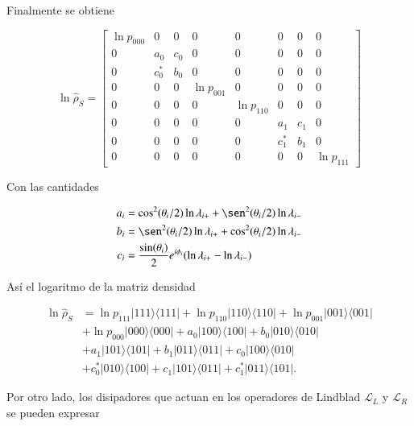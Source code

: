 \begin{appendixs}
Finalmente se obtiene

\begin{equation*}
    \ln \hat{\rho}_{S} = 
    \begin{bmatrix}
        \ln p_{000} & 0 & 0 & 0 & 0 & 0 & 0 & 0 \\
        0 & a_{0} & c_{0} & 0 & 0 & 0 & 0 & 0 \\
        0 & c^{*}_{0} & b_{0} & 0 & 0 & 0 & 0 & 0 \\
        0 & 0 & 0 & \ln p_{001} & 0 & 0 & 0 & 0 \\
        0 & 0 & 0 & 0 & \ln p_{110} & 0 & 0 & 0 \\
        0 & 0 & 0 & 0 & 0 & a_{1} & c_{1} & 0 \\
        0 & 0 & 0 & 0 & 0 & c^{*}_{1} & b_{1} & 0 \\
        0 & 0 & 0 & 0 & 0 & 0 & 0 & \ln p_{111} 
        \end{bmatrix}
\end{equation*}

Con las cantidades 

\begin{align*}
    a_{i} & = \cos^{2}(\theta_{i}/2) \ln \lambda_{i+} + \sen^{2}(\theta_{i}/2) \ln \lambda_{i-} \\
    b_{i} & = \sen^{2}(\theta_{i}/2) \ln \lambda_{i+} + \cos^{2}(\theta_{i}/2) \ln \lambda_{i-}  \\
    c_{i} & = \frac{\sin(\theta_{i})}{2}e^{i\phi_{i}} (\ln \lambda_{i+} - \ln \lambda_{i-})     
\end{align*}

Así el logaritmo de la matriz densidad

\begin{align*}
    \ln \hat{\rho}_{S} & = \ln p_{111}|111\rangle \langle 111| + \ln p_{110}|110\rangle \langle 110| + \ln p_{001}|001\rangle \langle 001| \\ 
     & + \ln p_{000}|000\rangle \langle 000| + a_{0}|100\rangle \langle 100| + b_{0}|010\rangle \langle 010|  \\  
     & + a_{1}|101\rangle \langle 101| + b_{1}|011\rangle\langle 011| + c_{0}|100\rangle \langle 010| \\ 
     & + c^{*}_{0}|010\rangle \langle 100| + c_{1}|101\rangle \langle 011| + c^{*}_{1}|011\rangle \langle 101|.
\end{align*}

Por otro lado, los disipadores que actuan en los operadores de Lindblad $\mathcal{L}_{L}$ y $\mathcal{L}_{R}$ se pueden expresar 


\end{appendixs}
